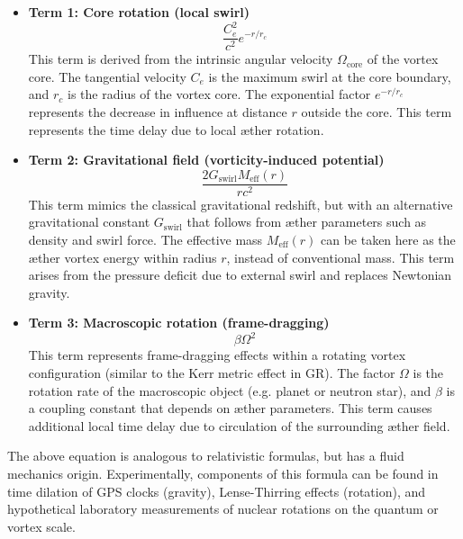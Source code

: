 \begin{itemize}
  \item \textbf{Term 1: Core rotation (local swirl)}
  \[
    \frac{C_e^2}{c^2} e^{-r/r_c}
  \]
  This term is derived from the intrinsic angular velocity $\Omega_\text{core}$ of the vortex core. The tangential velocity $C_e$ is the maximum swirl at the core boundary, and $r_c$ is the radius of the vortex core. The exponential factor $e^{-r/r_c}$ represents the decrease in influence at distance $r$ outside the core. This term represents the time delay due to local æther rotation.

  \item \textbf{Term 2: Gravitational field (vorticity-induced potential)}
  \[
    \frac{2 G_{\text{swirl}} M_{\text{eff}}(r)}{r c^2}
  \]
  This term mimics the classical gravitational redshift, but with an alternative gravitational constant $G_{\text{swirl}}$ that follows from æther parameters such as density and swirl force. The effective mass $M_{\text{eff}}(r)$ can be taken here as the æther vortex energy within radius $r$, instead of conventional mass. This term arises from the pressure deficit due to external swirl and replaces Newtonian gravity.

  \item \textbf{Term 3: Macroscopic rotation (frame-dragging)}
  \[
    \beta \Omega^2
  \]
  This term represents frame-dragging effects within a rotating vortex configuration (similar to the Kerr metric effect in GR). The factor $\Omega$ is the rotation rate of the macroscopic object (e.g. planet or neutron star), and $\beta$ is a coupling constant that depends on æther parameters. This term causes additional local time delay due to circulation of the surrounding æther field.

\end{itemize}

The above equation is analogous to relativistic formulas, but has a fluid mechanics origin. Experimentally, components of this formula can be found in time dilation of GPS clocks (gravity), Lense-Thirring effects (rotation), and hypothetical laboratory measurements of nuclear rotations on the quantum or vortex scale.